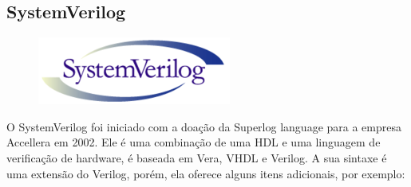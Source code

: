 \documentclass[12pt,a4paper]{article}
\begin{document}
\subsection{SystemVerilog}
\begin{figure}[!htb]
\includegraphics[scale=1]{./imagens/240px-SystemVerilog_logo.png}
\centering
\end{figure}
O SystemVerilog foi iniciado com a doação da Superlog language para a empresa Accellera em 2002. Ele é uma combinação de uma HDL e uma linguagem de verificação de hardware, é baseada em Vera, VHDL e Verilog. A sua sintaxe é uma extensão do Verilog, porém, ela oferece alguns itens adicionais, por exemplo:
\end{document}
